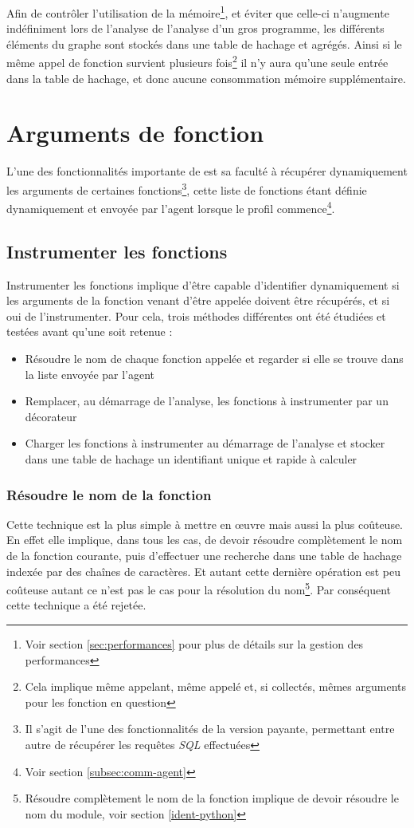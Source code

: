 \begin{note}
Afin de contrôler l'utilisation de la mémoire\footnote{Voir section \vref{sec:performances} pour plus de détails sur la gestion des performances}, et éviter que celle-ci n'augmente indéfiniment lors de l'analyse de l'analyse d'un gros programme, les différents éléments du graphe sont stockés dans une table de hachage et agrégés. Ainsi si le même appel de fonction survient plusieurs fois\footnote{Cela implique même appelant, même appelé et, si collectés, mêmes arguments pour les fonction en question} il n'y aura qu'une seule entrée dans la table de hachage, et donc aucune consommation mémoire supplémentaire.
\end{note}

  \section{Arguments de fonction}
  \label{sec:fnargs}
L'une des fonctionnalités importante de \Blackfire est sa faculté à récupérer dynamiquement les arguments de certaines fonctions\footnote{Il s'agit de l'une des fonctionnalités de la version payante, permettant entre autre de récupérer les requêtes \emph{SQL} effectuées}, cette liste de fonctions étant définie dynamiquement et envoyée par l'agent lorsque le profil commence\footnote{Voir section \vref{subsec:comm-agent}}.

\subsection{Instrumenter les fonctions}
Instrumenter les fonctions implique d'être capable d'identifier dynamiquement si les arguments de la fonction venant d'être appelée doivent être récupérés, et si oui de l'instrumenter. Pour cela, trois méthodes différentes ont été étudiées et testées avant qu'une soit retenue : 
\begin{itemize}
\item Résoudre le nom de chaque fonction appelée et regarder si elle se trouve dans la liste envoyée par l'agent
\item Remplacer, au démarrage de l'analyse, les fonctions à instrumenter par un décorateur
\item Charger les fonctions à instrumenter au démarrage de l'analyse et stocker dans une table de hachage un identifiant unique et rapide à calculer
\end{itemize}

\subsubsection*{Résoudre le nom de la fonction}
Cette technique est la plus simple à mettre en œuvre mais aussi la plus coûteuse. En effet elle implique, dans tous les cas, de devoir résoudre complètement le nom de la fonction courante, puis d'effectuer une recherche dans une table de hachage indexée par des chaînes de caractères. Et autant cette dernière opération est peu coûteuse autant ce n'est pas le cas pour la résolution du nom\footnote{Résoudre complètement le nom de la fonction implique de devoir résoudre le nom du module, voir section \vref{ident-python}}. Par conséquent cette technique a été rejetée.

